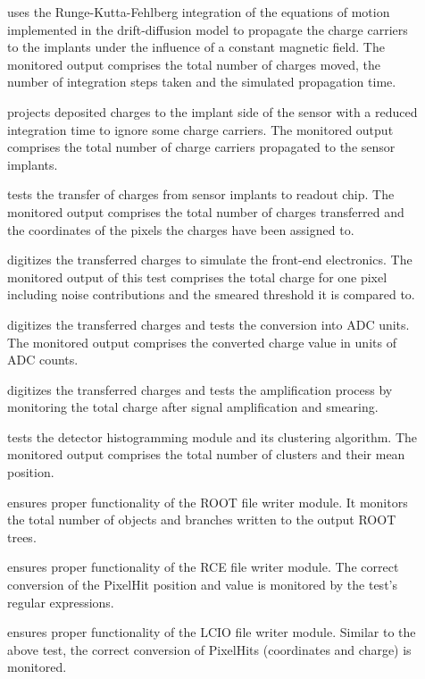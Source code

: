 \begin{description}
    \item[] uses the Runge-Kutta-Fehlberg integration of the equations of motion implemented in the drift-diffusion model to propagate the charge carriers to the implants under the influence of a constant magnetic field. The monitored output comprises the total number of charges moved, the number of integration steps taken and the simulated propagation time.
    \item[] projects deposited charges to the implant side of the sensor with a reduced integration time to ignore some charge carriers. The monitored output comprises the total number of charge carriers propagated to the sensor implants.
    \item[] tests the transfer of charges from sensor implants to readout chip. The monitored output comprises the total number of charges transferred and the coordinates of the pixels the charges have been assigned to.
    \item[] digitizes the transferred charges to simulate the front-end electronics. The monitored output of this test comprises the total charge for one pixel including noise contributions and the smeared threshold it is compared to.
    \item[] digitizes the transferred charges and tests the conversion into ADC units. The monitored output comprises the converted charge value in units of ADC counts.
    \item[] digitizes the transferred charges and tests the amplification process by monitoring the total charge after signal amplification and smearing.
    \item[] tests the detector histogramming module and its clustering algorithm. The monitored output comprises the total number of clusters and their mean position.
    \item[] ensures proper functionality of the ROOT file writer module. It monitors the total number of objects and branches written to the output ROOT trees.
    \item[] ensures proper functionality of the RCE file writer module. The correct conversion of the PixelHit position and value is monitored by the test's regular expressions.
    \item[] ensures proper functionality of the LCIO file writer module. Similar to the above test, the correct conversion of PixelHits (coordinates and charge) is monitored.

\end{description}
